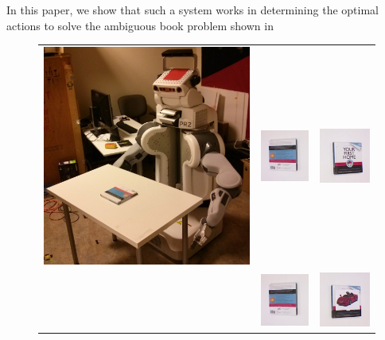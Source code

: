     In this paper, we show that such a system works in determining the optimal actions to solve the ambiguous book problem shown in 

    \setlength{\tabcolsep}{0.1em}
    \begin{figure}[ht]
    \begin{tabular}{cccc}
    \multicolumn{2}{c}{\multirow{-9}{*}{\includegraphics[width=0.46\columnwidth]{pics/pr2_init.jpg}}} & \includegraphics[width=0.23\columnwidth]{pics/first_back.jpg} 
    &\includegraphics[width=0.23\columnwidth]{pics/first_cover1.jpg} \\
    \multicolumn{2}{c}{} & \includegraphics[width=0.23\columnwidth]{pics/first_back.jpg} 
    &\includegraphics[width=0.23\columnwidth]{pics/first_cover2.jpg} \\

\end{tabular}
\end{figure}
